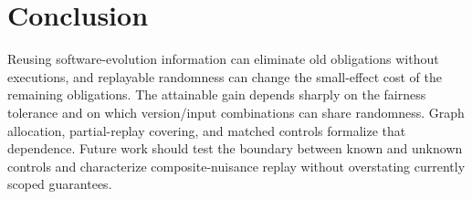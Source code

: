 \section{Conclusion}
Reusing software-evolution information can eliminate old obligations without executions, and replayable randomness can change the small-effect cost of the remaining obligations. The attainable gain depends sharply on the fairness tolerance and on which version/input combinations can share randomness. Graph allocation, partial-replay covering, and matched controls formalize that dependence. Future work should test the boundary between known and unknown controls and characterize composite-nuisance replay without overstating currently scoped guarantees.
